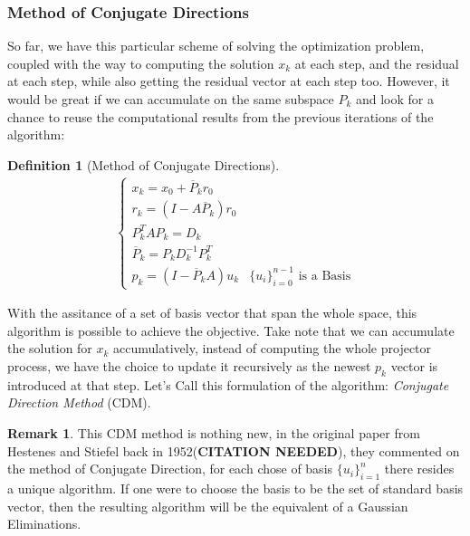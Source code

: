 \documentclass[]{article}
\theoremstyle{definition}
\newtheorem{definition}{Definition}
\newtheorem{remark}{Remark}[subsection]
\begin{document}
        \subsubsection{Method of Conjugate Directions}
            So far, we have this particular scheme of solving the optimization problem, coupled with the way to computing the solution $x_k$ at each step, and the residual at each step, while also getting the residual vector at each step too. However, it would be great if we can accumulate on the same subspace $P_k$ and look for a chance to reuse the computational results from the previous iterations of the algorithm: 
            \begin{definition}[Method of Conjugate Directions]
                \begin{align}
                    \begin{cases}
                        x_k = x_0 + \overline{P}_k r_0
                        \\
                        r_k = (I - A\overline{P}_k) r_0
                        \\
                        P^T_kAP_k = D_k
                        \\
                        \overline{P}_k = P_kD^{-1}_kP_k^T
                        \\
                        p_k = (I - \overline{P}_kA)u_k & \{u_i\}_{i = 0}^{n - 1} \text{ is a Basis}
                    \end{cases}
                \end{align}
            \end{definition}
            With the assitance of a set of basis vector that span the whole space, this algorithm is possible to achieve the objective. Take note that we can accumulate the solution for $x_k$ accumulatively, instead of computing the whole projector process, we have the choice to update it recursively as the newest $p_k$ vector is introduced at that step. Let's Call this formulation of the algorithm: \textit{Conjugate Direction Method }(CDM). 
            \begin{remark}
                This CDM method is nothing new, in the original paper from Hestenes and Stiefel back in 1952(\textbf{CITATION NEEDED}), they commented on the method of Conjugate Direction, for each chose of basis $\{u_i\}_{i = 1}^n$ there resides a unique algorithm. If one were to choose the basis to be the set of standard basis vector, then the resulting algorithm will be the equivalent of a Gaussian Eliminations. 
            \end{remark}
\end{document}
